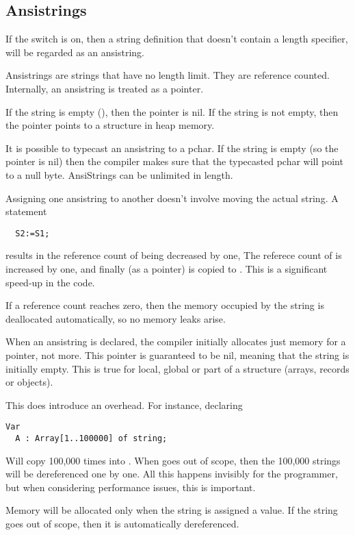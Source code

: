 \subsection{Ansistrings}

If the  switch is on, then a string definition that doesn't
contain a length specifier, will be regarded as an ansistring.

Ansistrings are strings that have no length limit. They are reference
counted. Internally, an ansistring is treated as a pointer.

If the string is empty (), then the pointer is nil.
If the string is not empty, then the pointer points to a structure in
heap memory.

It is possible to typecast an ansistring to a pchar.
If the string is empty (so the pointer is nil) then the compiler
makes sure that the typecasted pchar will point to a null byte. AnsiStrings
can be unlimited in length.

Assigning one ansistring to another doesn't involve moving the actual
string. A statement
\begin{verbatim}
  S2:=S1;
\end{verbatim}
results in the reference count of  being decreased by one,
The referece count of  is increased by one, and finally 
(as a pointer) is copied to . This is a significant speed-up in
the code.

If a reference count reaches zero, then the memory occupied by the
string is deallocated automatically, so no memory leaks arise.

When an ansistring is declared, the \fpc compiler initially
allocates just memory for a pointer, not more. This pointer is guaranteed
to be nil, meaning that the string is initially empty. This is
true for local, global or part of a structure (arrays, records or objects).

This does introduce an overhead. For instance, declaring
\begin{verbatim}
Var
  A : Array[1..100000] of string;
\end{verbatim}
Will copy 100,000 times  into . When  goes out of scope, then
the 100,000 strings will be dereferenced one by one. All this happens
invisibly for the programmer, but when considering performance issues,
this is important.

Memory will be allocated only when the string is assigned a value.
If the string goes out of scope, then it is automatically dereferenced.

